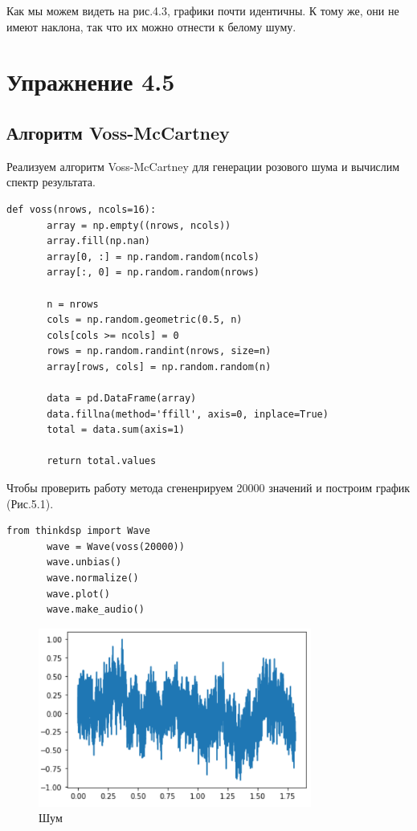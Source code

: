 \documentclass[a4paper,12pt]{report}
\begin{document}
    Как мы можем видеть на рис.4.3, графики почти идентичны. К тому же, они не имеют наклона, так что их можно отнести к белому шуму.   
 
\chapter{Упражнение 4.5}
\section{Алгоритм Voss-McCartney}
    Реализуем алгоритм Voss-McCartney для генерации розового шума и вычислим спектр результата. 
\begin{lstlisting}[caption=Алгоритм Voss-McCartney]
       def voss(nrows, ncols=16):
       array = np.empty((nrows, ncols))
       array.fill(np.nan)
       array[0, :] = np.random.random(ncols)
       array[:, 0] = np.random.random(nrows)
    
       n = nrows
       cols = np.random.geometric(0.5, n)
       cols[cols >= ncols] = 0
       rows = np.random.randint(nrows, size=n)
       array[rows, cols] = np.random.random(n)

       data = pd.DataFrame(array)
       data.fillna(method='ffill', axis=0, inplace=True)
       total = data.sum(axis=1)

       return total.values
\end{lstlisting}

    Чтобы проверить работу метода сгененрируем 20000 значений и построим график (Рис.5.1).
\begin{lstlisting}[caption=Генерация розового шума]
       from thinkdsp import Wave
       wave = Wave(voss(20000))
       wave.unbias()
       wave.normalize()
       wave.plot()
       wave.make_audio()
\end{lstlisting}
\begin{figure}[H]
        \centering
        \includegraphics[width=0.8\textwidth]{fig5-1.PNG}
        \caption{Шум}
        \label{fig:fig5-1}
\end{figure} 
\end{document}
